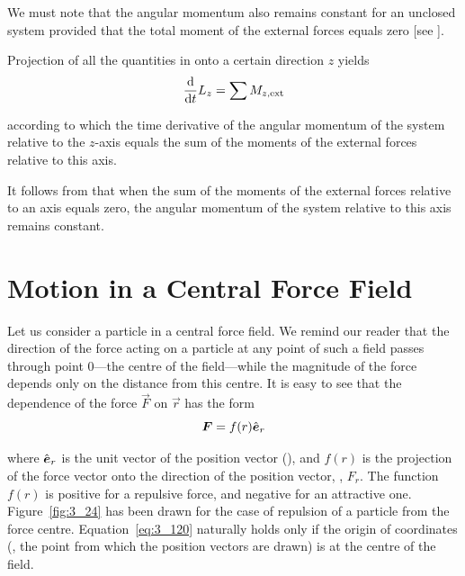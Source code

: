 We must note that the angular momentum also remains constant for an unclosed system provided that the total moment of the external forces equals zero [see ].

Projection of all the quantities in  onto a certain direction $z$ yields
\begin{equation}\label{eq:3_119}
\frac{\mathrm{d}}{\mathrm{d} t} L_z = \sum M_{z,\text{ext}}
\end{equation}

\noindent
according to which the time derivative of the angular momentum of the system relative to the $z$-axis equals the sum of the moments of the external forces relative to this axis.

It follows from  that when the sum of the moments of the external forces relative to an axis equals zero, the angular momentum of the system relative to this axis remains constant.

\section{Motion in a Central Force Field}\label{sec:3_13}

Let us consider a particle in a central force field. We remind our reader that the direction of the force acting on a particle at any point of such a field passes through point $0$---the centre of the field---while the magnitude of the force depends only on the distance from this centre. It is easy to see that the dependence of the force $\vec{F}$ on $\vec{r}$ has the form
\begin{equation}\label{eq:3_120}
\boldsymbol{F} = f(r) \hat{\boldsymbol{e}}_{r}
\end{equation}

\noindent
where $\hat{\boldsymbol{e}}_{r}$ is the unit vector of the position vector (), and $f(r)$ is the projection of the force vector onto the direction of the position vector, \ie, $F_r$. The function $f(r)$ is positive for a repulsive force, and negative for an attractive one. Figure~\ref{fig:3_24} has been drawn for the case of repulsion of a particle from the force centre. Equation~\eqref{eq:3_120} naturally holds only if the origin of coordinates (\ie, the point from which the position vectors are drawn) is at the centre of the field.

